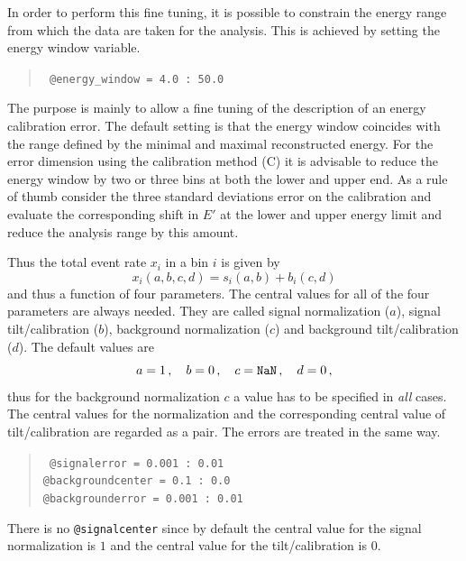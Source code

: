 In order to perform this fine tuning, it is possible to constrain 
the energy range from which the data are taken for the 
analysis. This is achieved by setting the energy window
variable. 
\begin{quote}
{\tt 
\tb @energy\_window = 4.0 : 50.0 
}
\end{quote}
The purpose is mainly to allow a fine tuning of the description
of an energy calibration error. The default setting is that the energy window
coincides with the range defined by the minimal and maximal reconstructed 
energy. For the error dimension using the calibration method (C) it is 
advisable to reduce the energy window by two or three bins at both the lower
and upper end. As a rule of
thumb consider the three standard deviations error on the calibration and
evaluate the corresponding shift in $E'$ at the lower and upper energy limit 
and reduce the analysis range by this amount.

Thus the total event rate $x_i$ in a bin $i$ is given by
\begin{equation}
x_i(a,b,c,d)=s_i(a,b)+b_i(c,d)
\end{equation}
and thus a function of four parameters. The central values for all of
the four parameters are always needed. They are called signal normalization
($a$), signal tilt/calibration ($b$), background  normalization ($c$) and
background tilt/calibration ($d$). The default values are
\begin{equation}
a=1\,,\quad b=0\,,\quad c={\tt NaN}\,,\quad d=0\,,
\end{equation}
thus for the background normalization $c$ a value has to be specified in 
\emph{all} cases. The central values for the normalization and the 
corresponding central value of tilt/calibration are regarded
as a pair. The errors are treated in the same way.
\begin{quote}
{\tt
\tb @signalerror =       0.001  :       0.01\\
\tb @backgroundcenter =  0.1 :       0.0\\
\tb @backgrounderror =   0.001 :       0.01
}
\end{quote}
There is no {\tt @signalcenter} since by default the central value for the
signal normalization is $1$ and the central value for the tilt/calibration 
is $0$.  

